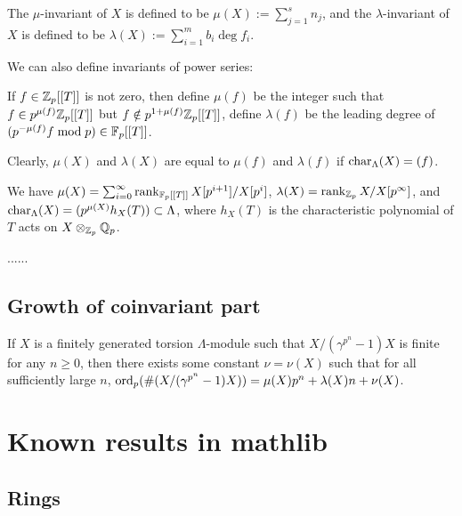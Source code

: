 \begin{definition}
\label{iwasawa-mod-invariants}
The $\mu$-invariant of $X$
is defined to be $\mu(X):=\sum_{j=1}^sn_j$,
and the $\lambda$-invariant of $X$
is defined to be $\lambda(X):=\sum_{i=1}^mb_i\deg f_i$.
\end{definition}

We can also define invariants of power series:

\begin{definition}
\label{power-series-invariants}
If $f\in{\mathbb {Z}}_p[[T]]$ is not zero, then define
$\mu(f)$ be the integer such that
$f\in p^{\mu(f)}{\mathbb {Z}}_p[[T]]$ but
$f\notin p^{1+\mu(f)}{\mathbb {Z}}_p[[T]]$,
define $\lambda(f)$ be the leading degree of
$(p^{-\mu(f)}f\bmod p)\in{\mathbb {F}}_p[[T]]$.
\end{definition}

Clearly, $\mu(X)$ and $\lambda(X)$ are equal to
$\mu(f)$ and $\lambda(f)$ if $\operatorname{char}_\Lambda(X)=(f)$.

\begin{prop}
\label{iwasawa-mod-invariants-2}
We have $\mu(X)=\sum_{i=0}^\infty\operatorname{rank}_{{\mathbb {F}}_p[[T]]}X[p^{i+1}]/X[p^i]$,
$\lambda(X)=\operatorname{rank}_{{\mathbb {Z}}_p}X/X[p^\infty]$,
and $\operatorname{char}_\Lambda(X)=(p^{\mu(X)}h_X(T))\subset\Lambda$,
where $h_X(T)$ is the characteristic polynomial of $T$ acts on
$X\otimes_{{\mathbb {Z}}_p}{\mathbb {Q}}_p$.
\end{prop}

......

\subsection{Growth of coinvariant part}

\begin{prop}
\label{coinvariant-growth}
If $X$ is a finitely generated torsion
$\Lambda$-module such that $X/(\gamma^{p^n}-1)X$ is finite
for any $n\geq 0$, then
there exists some constant $\nu=\nu(X)$
such that for all sufficiently large $n$,
$\operatorname{ord}_p(\#(X/(\gamma^{p^n}-1)X))=\mu(X)p^n
+\lambda(X)n+\nu(X)$.
\end{prop}

\appendix

\section{Known results in mathlib}

\subsection{Rings}

